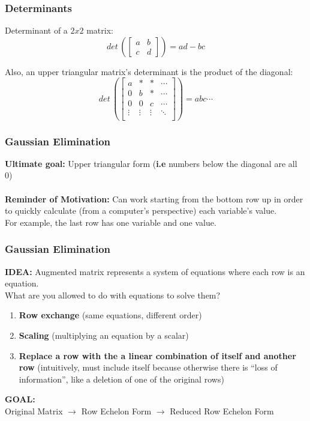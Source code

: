\documentclass{beamer}
\begin{document}
\begin{frame}[t]\vspace{10pt}
\frametitle{Determinants}
Determinant of a $2 x 2$ matrix: \\
\[ 
det \, (
\begin{bmatrix} a & b \\ c & d \end{bmatrix}
)
= ad - bc
\]

Also, an upper triangular matrix’s determinant is the product of the diagonal: \\
\[ 
det \, (
\begin{bmatrix} 
a & * & * & \cdots \\
0 & b & * & \cdots \\
0 & 0 & c & \cdots \\
\vdots & \vdots & \vdots & \ddots \\
 \end{bmatrix}
)
= abc \cdots
\]
\end{frame}



\begin{frame}[t]\vspace{10pt}
\frametitle{Gaussian Elimination}
\textbf{Ultimate goal: } Upper triangular form (\textbf{i.e} numbers below the diagonal are all 0) \\~\\
\textbf{Reminder of Motivation:} Can work starting from the bottom row up in order to quickly calculate (from a computer’s perspective) each variable’s value. \\
For example, the last row has one variable and one value. 
\end{frame}


\begin{frame}[t]\vspace{10pt}
\frametitle{Gaussian Elimination}
\textbf{IDEA: } Augmented matrix represents a system of equations where each row is an equation. \\
What are you allowed to do with equations to solve them?

\begin{enumerate}
\item \textbf{Row exchange} (same equations,  different order)
\item \textbf{Scaling} (multiplying an equation by  a scalar)
\item \textbf{Replace a row with the a linear combination of itself and another row} (intuitively, must include itself because otherwise there is “loss of information”, like a deletion of one of the original rows)
\end{enumerate}

\textbf{GOAL:} \\ Original Matrix $\rightarrow$ Row Echelon Form $\rightarrow $ Reduced Row Echelon Form
\end{frame}
\end{document}
